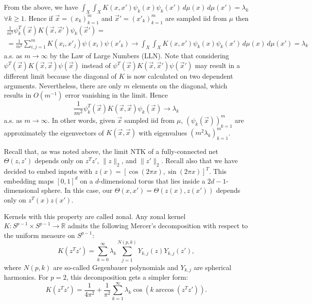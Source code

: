\documentclass{article}
\newcommand{\RR}{\mathbb{R}}
\begin{document}
    From the above, we have $\int_X \int_X K(x,x') \psi_k(x) \psi_k(x') \, d\mu(x) \, d\mu(x') = \lambda_k$ $\forall k \geq 1$.
    Hence if $\vec x = (x_k)_{k=1}^m$ and $\vec x' = (x'_k)_{k=1}^m$ are sampled iid from $\mu$ then 
    \begin{multline}
        \frac{1}{m^2} \psi_k^T(\vec x) K(\vec x, \vec x') \psi_k(\vec x')
        =\\= \frac{1}{m^2} \sum_{i,j=1}^m K(x_i, x'_j) \psi(x_i) \psi(x'_k) 
        \to \int_X \int_X K(x,x') \psi_k(x) \psi_k(x') \, d\mu(x) \, d\mu(x') 
        = \lambda_k
    \end{multline}
    a.s. as $m \to \infty$ by the Law of Large Numbers (LLN).
    Note that considering $\psi^T(\vec x) K(\vec x, \vec x) \psi(\vec x)$ instead of $\psi^T(\vec x) K(\vec x, \vec x') \psi(\vec x')$ may result in a different limit because the diagonal of $K$ is now calculated on two dependent arguments.
    Nevertheless, there are only $m$ elements on the diagonal, which results in $O(m^{-1})$ error vanishing in the limit.
    Hence
    \begin{equation}
        \frac{1}{m^2} \psi_k^T(\vec x) K(\vec x, \vec x) \psi_k(\vec x)
        \to \lambda_k
    \end{equation}
    a.s. as $m \to \infty$.
    In other words, given $\vec x$ sampled iid from $\mu$, $(\psi_k(\vec x))_{k=1}^m$ are approximately the eigenvectors of $K(\vec x, \vec x)$ with eigenvalues $(m^2 \lambda_k)_{k=1}^m$.

    Recall that, as was noted above, the limit NTK of a fully-connected net $\Theta(z,z')$ depends only on $z^T z'$, $\|z\|_2$, and $\|z'\|_2$.
    Recall also that we have decided to embed inputs with $z(x) = [\cos(2\pi x), \sin(2\pi x)]^T$.
    This embedding maps $[0,1]^d$ on a $d$-dimensional torus that lies inside a $2d-1$-dimensional sphere.
    In this case, our $\Theta(x,x') = \Theta(z(x),z(x'))$ depends only on $z^T(x) z(x')$.

    Kernels with this property are called zonal.
    Any zonal kernel $K: S^{p-1} \times S^{p-1} \to \RR$ admits the following Mercer's decomposition with respect to the uniform measure on $S^{p-1}$:
    \begin{equation}
        K(z^T z')
        = \sum_{k=0}^\infty \lambda_k \sum_{j=1}^{N(p,k)} Y_{k,j}(z) Y_{k,j}(z'),
    \end{equation}
    where $N(p,k)$ are so-called Gegenbauer polynomials and $Y_{k,j}$ are spherical harmonics.
    For $p=2$, this decomposition gets a simpler form:
    \begin{equation}
        K(z^T z')
        = \frac{1}{4\pi^2} + \frac{1}{\pi^2} \sum_{k=1}^\infty \lambda_k \cos(k \arccos(z^T z')).
        \label{eq:mercer_zonal_2d}
    \end{equation}
\end{document}
